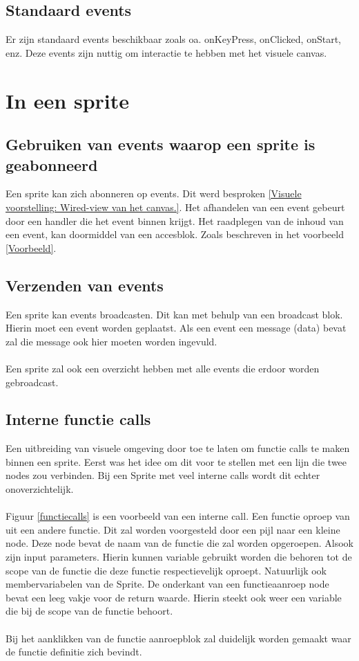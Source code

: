 \documentclass[]{article}
\begin{document}
\subsection{Standaard events}
Er zijn standaard events beschikbaar zoals oa. onKeyPress, onClicked, onStart, enz. Deze events zijn nuttig om interactie te hebben met het visuele canvas.  
\section{In een sprite}
\subsection{Gebruiken van events waarop een sprite is geabonneerd}
Een sprite kan zich abonneren op events. Dit werd besproken \ref{Visuele voorstelling: Wired-view van het canvas.}. Het afhandelen van een event gebeurt door een handler die het event binnen krijgt. Het raadplegen van de inhoud van een event, kan doormiddel van een accesblok. Zoals beschreven in het voorbeeld \ref{Voorbeeld}.
\subsection{Verzenden van events}
Een sprite kan events broadcasten. Dit kan met behulp van een broadcast blok. Hierin moet een event worden geplaatst. Als een event een message (data) bevat zal die message ook hier moeten worden ingevuld. \\\\
Een sprite zal ook een overzicht hebben met alle events die erdoor worden gebroadcast.
\subsection{Interne functie calls}
Een uitbreiding van visuele omgeving door toe te laten om functie calls te maken binnen een sprite. Eerst was het idee om dit voor te stellen met een lijn die twee nodes zou verbinden. Bij een Sprite met veel interne calls wordt dit echter onoverzichtelijk.\\\\
Figuur \ref{functiecalls} is een voorbeeld van een interne call. Een functie oproep van uit een andere functie. Dit zal worden voorgesteld door een pijl naar een kleine node. Deze node bevat de naam van de functie die zal worden opgeroepen. Alsook zijn input parameters. Hierin kunnen variable gebruikt worden die behoren tot de scope van de functie die deze functie respectievelijk oproept. Natuurlijk ook membervariabelen van de Sprite. De onderkant van een functieaanroep node bevat een leeg vakje voor de return waarde. Hierin steekt ook weer een variable die bij de scope van de functie behoort.\\\\
Bij het aanklikken van de functie aanroepblok zal duidelijk worden gemaakt waar de functie definitie zich bevindt.
\end{document}
